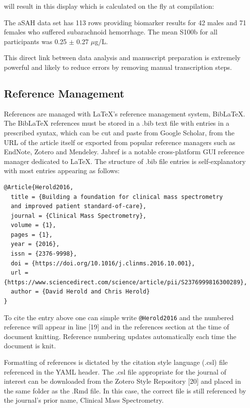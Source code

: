 \documentclass[]{elsarticle} %
\begin{document}
\vspace{12pt}

\noindent will result in this display which is calculated on the fly at
compilation:

\vspace{12pt}

\noindent The aSAH data set has 113 rows providing biomarker results for
42 males and 71 females who suffered subarachnoid hemorrhage. The mean
S100b for all participants was 0.25 \(\pm\) 0.27 \(\mu\)g/L.

This direct link between data analysis and manuscript preparation is
extremely powerful and likely to reduce errors by removing manual
transcription steps.

\hypertarget{reference-management}{%
\subsection{Reference Management}\label{reference-management}}

References are managed with LaTeX's reference management system,
BibLaTeX. The BibLaTeX references must be stored in a .bib text file
with entries in a prescribed syntax, which can be cut and paste from
Google Scholar, from the URL of the article itself or exported from
popular reference managers such as EndNote, Zotero and Mendeley. Jabref
is a notable cross-platform GUI reference manager dedicated to LaTeX.
The structure of .bib file entries is self-explanatory with most entries
appearing as follows:

\begin{verbatim}
@Article{Herold2016,
  title = {Building a foundation for clinical mass spectrometry
  and improved patient standard-of-care},
  journal = {Clinical Mass Spectrometry},
  volume = {1},
  pages = {1},
  year = {2016},
  issn = {2376-9998},
  doi = {https://doi.org/10.1016/j.clinms.2016.10.001},
  url = {https://www.sciencedirect.com/science/article/pii/S2376999816300289},
  author = {David Herold and Chris Herold}
}
\end{verbatim}

To cite the entry above one can simple write \texttt{@Herold2016} and
the numbered reference will appear in line {[}19{]} and in the
references section at the time of document knitting. Reference numbering
updates automatically each time the document is knit.

Formatting of references is dictated by the citation style language
(.csl) file referenced in the YAML header. The .csl file appropriate for
the journal of interest can be downloaded from the Zotero Style
Repository {[}20{]} and placed in the same folder as the .Rmd file. In
this case, the correct file is still referenced by the journal's prior
name, Clinical Mass Spectrometry.
\end{document}
